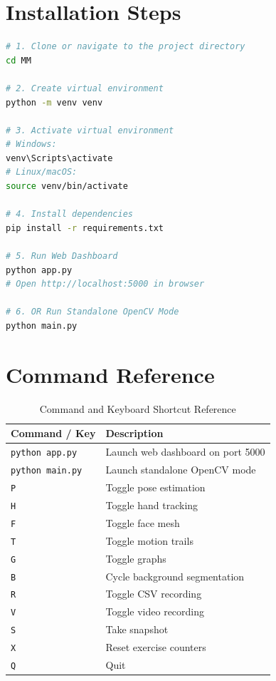 \documentclass[a4paper,12pt]{report}
\begin{document}
\section{Installation Steps}
\begin{lstlisting}[language=bash, caption=Installation Commands]
# 1. Clone or navigate to the project directory
cd MM

# 2. Create virtual environment
python -m venv venv

# 3. Activate virtual environment
# Windows:
venv\Scripts\activate
# Linux/macOS:
source venv/bin/activate

# 4. Install dependencies
pip install -r requirements.txt

# 5. Run Web Dashboard
python app.py
# Open http://localhost:5000 in browser

# 6. OR Run Standalone OpenCV Mode
python main.py
\end{lstlisting}

\section{Command Reference}

\begin{table}[H]
\centering
\begin{tabular}{|l|p{8cm}|}
\hline
\textbf{Command / Key} & \textbf{Description} \\
\hline
\texttt{python app.py} & Launch web dashboard on port 5000 \\
\texttt{python main.py} & Launch standalone OpenCV mode \\
\texttt{P} & Toggle pose estimation \\
\texttt{H} & Toggle hand tracking \\
\texttt{F} & Toggle face mesh \\
\texttt{T} & Toggle motion trails \\
\texttt{G} & Toggle graphs \\
\texttt{B} & Cycle background segmentation \\
\texttt{R} & Toggle CSV recording \\
\texttt{V} & Toggle video recording \\
\texttt{S} & Take snapshot \\
\texttt{X} & Reset exercise counters \\
\texttt{Q} & Quit \\
\hline
\end{tabular}
\caption{Command and Keyboard Shortcut Reference}
\label{tab:commands}
\end{table}
\end{document}
